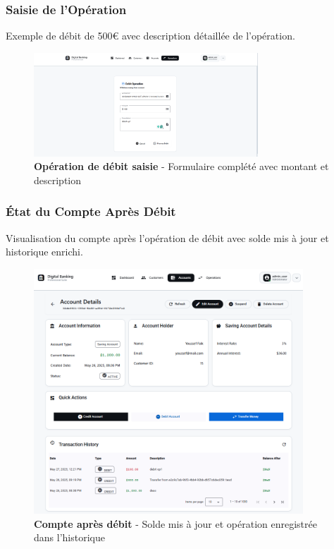 \documentclass[11pt, a4paper]{article}
\begin{document}
\subsubsection{Saisie de l'Opération}

Exemple de débit de 500€ avec description détaillée de l'opération.

\begin{figure}[H]
    \centering
    \includegraphics[width=0.75\textwidth]{screenshots/06_02_operation_debit_form_filled.png}
    \caption{\textbf{Opération de débit saisie} - Formulaire complété avec montant et description}
    \label{fig:operation_debit_form_filled}
\end{figure}

\subsubsection{État du Compte Après Débit}

Visualisation du compte après l'opération de débit avec solde mis à jour et historique enrichi.

\begin{figure}[H]
    \centering
    \includegraphics[width=0.9\textwidth]{screenshots/06_03_account_details_after_debit.png}
    \caption{\textbf{Compte après débit} - Solde mis à jour et opération enregistrée dans l'historique}
    \label{fig:account_details_after_debit}
\end{figure}
\end{document}
